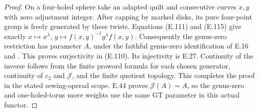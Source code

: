 \begin{proof}
On a four-holed sphere take an adapted
quilt and consecutive curves $x,y$ with
zero adjustment integer.  After capping
by marked disks, its pure four-point
group is freely generated by these
twists.  Equations (E.111) and (E.115)
give exactly
$x\mapsto x^\lambda$,
$y\mapsto f(x,y)^{-1}y^\lambda f(x,y)$.
Consequently the genus-zero restriction
has parameter $A$, under the faithful
genus-zero identification of E.16 and
\cite[Proposition 4.7]{ET_BonattoRobertson2026}.
This proves surjectivity in (E.110).
Its injectivity is E.27.
Continuity of the inverse follows from
the finite proword formula for each
chosen generator, continuity of
$c_2$ and $\mathcal J$, and the finite
quotient topology.  This completes the
proof in the stated sewing-operad scope.
E.44 proves $\mathcal J(A)=A$, so the genus-zero
and one-holed-torus move weights use the same
GT parameter in this actual functor.
\end{proof}

